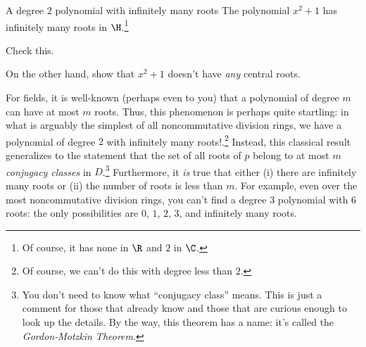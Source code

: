 \begin{exm}{A degree $2$ polynomial with infinitely many roots}{}
	The polynomial $x^2+1$ has infinitely many roots in $\H$.\footnote{Of course, it has none in $\R$ and $2$ in $\C$.}
	\begin{exr}[breakable=false]{}{}
		Check this.
	\end{exr}
	\begin{exr}[breakable=false]{}{}
		On the other hand, show that $x^2+1$ doesn't have \emph{any} central roots.
	\end{exr}
	\begin{rmk}
		For fields, it is well-known (perhaps even to you) that a polynomial of degree $m$ can have at most $m$ roots.  Thus, this phenomenon is perhaps quite startling:  in what is arguably the simplest of all noncommutative division rings, we have a polynomial of degree $2$ with infinitely many roots!.\footnote{Of course, we can't do this with degree less than $2$.}  Instead, this classical result generalizes to the statement that the set of all roots of $p$ belong to at most $m$ \emph{conjugacy classes} in $D$.\footnote{You don't need to know what ``conjugacy class'' means.  This is just a comment for those that already know and those that are curious enough to look up the details.  By the way, this theorem has a name:  it's called the \emph{Gordon-Motzkin Theorem}.}  Furthermore, it \emph{is} true that either (i) there are infinitely many roots or (ii) the number of roots is less than $m$.  For example, even over the most noncommutative division rings, you can't find a degree $3$ polynomial with $6$ roots:  the only possibilities are $0$, $1$, $2$, $3$, and infinitely many roots.
	\end{rmk}
\end{exm}
